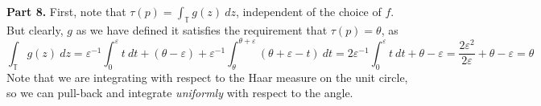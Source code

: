 \documentclass[aps,pra,showpacs,notitlepage,onecolumn,superscriptaddress,nofootinbib]{revtex4-1}
\newcommand{\hhrulefill}{\hspace{-1.0em}\hrulefill}
\theoremstyle{definition}
\begin{document}
    \noindent \textbf{Part 8.} First, note that $\tau(p) = \int_{\mathbb{T}} g(z) \ dz$, independent of the choice of $f$. But clearly, $g$ as we have defined it satisfies the requirement that $\tau(p) = \theta$, as
    \begin{equation}
      \displaystyle\int_{\mathbb{T}} g(z) \ dz = \varepsilon^{-1} \displaystyle\int_{0}^{\varepsilon} t \ dt + (\theta - \varepsilon) + \varepsilon^{-1} \displaystyle\int_{\theta}^{\theta + \varepsilon} (\theta + \varepsilon - t) \ dt = 2 \varepsilon^{-1} \displaystyle\int_{0}^{\varepsilon} t \ dt + \theta - \varepsilon = \frac{2\varepsilon^2}{2\varepsilon} + \theta - \varepsilon = \theta
    \end{equation}
    Note that we are integrating with respect to the Haar measure on the unit circle, so we can pull-back and integrate \emph{uniformly} with respect to the angle.
    \newline

\hhrulefill
\end{document}
